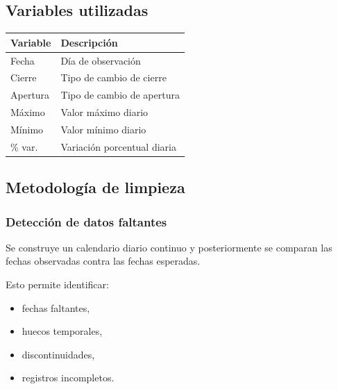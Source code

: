 \subsection{Variables utilizadas}

\begin{table}[H]
\centering
\begin{tabular}{ll}
\toprule
Variable & Descripción\\
\midrule
Fecha & Día de observación\\
Cierre & Tipo de cambio de cierre\\
Apertura & Tipo de cambio de apertura\\
Máximo & Valor máximo diario\\
Mínimo & Valor mínimo diario\\
\% var. & Variación porcentual diaria\\
\bottomrule
\end{tabular}
\end{table}

\subsection{Metodología de limpieza}

\subsubsection{Detección de datos faltantes}

Se construye un calendario diario continuo y posteriormente se comparan las fechas observadas contra las fechas esperadas.

Esto permite identificar:

\begin{itemize}
\item fechas faltantes,
\item huecos temporales,
\item discontinuidades,
\item registros incompletos.
\end{itemize}

